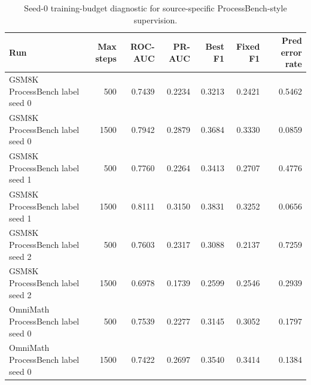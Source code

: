 \begin{table}[t]
\centering
\small
\begin{tabular}{lrrrrrr}
\toprule
Run & Max steps & ROC-AUC & PR-AUC & Best F1 & Fixed F1 & Pred error rate \\
\midrule
GSM8K ProcessBench label seed 0 & 500 & 0.7439 & 0.2234 & 0.3213 & 0.2421 & 0.5462 \\
GSM8K ProcessBench label seed 0 & 1500 & 0.7942 & 0.2879 & 0.3684 & 0.3330 & 0.0859 \\
GSM8K ProcessBench label seed 1 & 500 & 0.7760 & 0.2264 & 0.3413 & 0.2707 & 0.4776 \\
GSM8K ProcessBench label seed 1 & 1500 & 0.8111 & 0.3150 & 0.3831 & 0.3252 & 0.0656 \\
GSM8K ProcessBench label seed 2 & 500 & 0.7603 & 0.2317 & 0.3088 & 0.2137 & 0.7259 \\
GSM8K ProcessBench label seed 2 & 1500 & 0.6978 & 0.1739 & 0.2599 & 0.2546 & 0.2939 \\
OmniMath ProcessBench label seed 0 & 500 & 0.7539 & 0.2277 & 0.3145 & 0.3052 & 0.1797 \\
OmniMath ProcessBench label seed 0 & 1500 & 0.7422 & 0.2697 & 0.3540 & 0.3414 & 0.1384 \\
\bottomrule
\end{tabular}
\caption{Seed-0 training-budget diagnostic for source-specific ProcessBench-style supervision.}
\label{tab:phase-b-training-budget}
\end{table}
